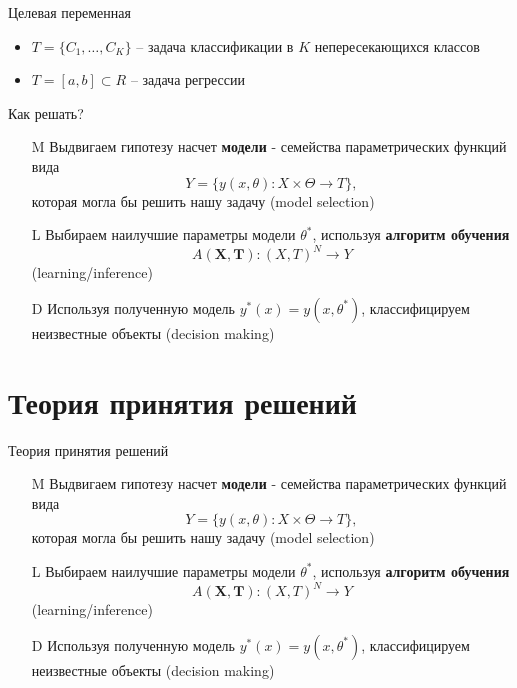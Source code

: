 \documentclass[10pt,a4paper]{beamer}
\begin{document}
\begin{frame}{Целевая переменная}

\begin{itemize}
\item $T = \{C_1, \ldots, C_K\}$ -- задача классификации в $K$ непересекающихся классов
\item $T = [a, b] \subset R $ -- задача регрессии
\end{itemize}


\end{frame}

\begin{frame}{Как решать?}

\begin{enumerate}

\item[M] Выдвигаем гипотезу насчет {\bf модели} - семейства параметрических функций вида
\[
Y = \{ y(x, \theta) : X \times \Theta \rightarrow T \},
\]
которая могла бы решить нашу задачу (model selection)

\item[L] Выбираем наилучшие параметры модели $\theta^*$, используя {\bf алгоритм обучения}
\[
A(\boldsymbol X, \boldsymbol T) : (X, T)^N \rightarrow Y
\]
(learning/inference)

\item[D] Используя полученную модель $y^*(x) = y(x, \theta^*)$, классифицируем неизвестные объекты (decision making)

\end{enumerate}

\end{frame}


\section{Теория принятия решений}


\begin{frame}{Теория принятия решений}

\begin{enumerate}

\item[M] {\color{gray} Выдвигаем гипотезу насчет {\bf модели} - семейства параметрических функций вида
\[
Y = \{ y(x, \theta) : X \times \Theta \rightarrow T \},
\]
которая могла бы решить нашу задачу (model selection)}

\item[L] {\color{gray} Выбираем наилучшие параметры модели $\theta^*$, используя {\bf алгоритм обучения}
\[
A(\boldsymbol X, \boldsymbol T) : (X, T)^N \rightarrow Y
\]
(learning/inference)}

\item[D] {Используя полученную модель $y^*(x) = y(x, \theta^*)$, классифицируем неизвестные объекты (decision making)}

\end{enumerate}

\end{frame}
\end{document}
